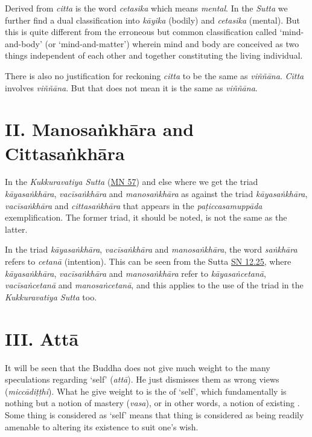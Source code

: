 Derived from \emph{citta} is the word \emph{cetasika} which means \emph{mental}. In the \emph{Sutta} we further find a dual classification into \emph{kāyika} (bodily) and \emph{cetasika} (mental). But this is quite different from the erroneous but common classification called `mind-and-body' (or `mind-and-matter') wherein mind and body are conceived as two things independent of each other and together constituting the living individual.

There is also no justification for reckoning \emph{citta} to be the same as \emph{viññāna}. \emph{Citta} involves \emph{viññāna}. But that does not mean it is the same as \emph{viññāna}.

\hypertarget{_ii_manosaux1e45khux101ra_and_cittasaux1e45khux101ra}{%
\section{II. Manosaṅkhāra and Cittasaṅkhāra}\label{_ii_manosaux1e45khux101ra_and_cittasaux1e45khux101ra}}

In the \emph{Kukkuravatiya Sutta} (\href{https://suttacentral.net/mn57/en/bodhi}{MN 57}) and else where we get the triad \emph{kāyasaṅkhāra}, \emph{vacīsaṅkhāra} and \emph{manosaṅkhāra} as against the triad \emph{kāyasaṅkhāra}, \emph{vacīsaṅkhāra} and \emph{cittasaṅkhāra} that appears in the \emph{paṭiccasamuppāda} exemplification. The former triad, it should be noted, is not the same as the latter.

In the triad \emph{kāyasaṅkhāra}, \emph{vacīsaṅkhāra} and \emph{manosaṅkhāra}, the word \emph{saṅkhāra} refers to \emph{cetanā} (intention). This can be seen from the Sutta \href{https://suttacentral.net/sn12.25/en/bodhi}{SN 12.25}, where \emph{kāyasaṅkhāra}, \emph{vacīsaṅkhāra} and \emph{manosaṅkhāra} refer to \emph{kāyasaṅcetanā}, \emph{vacīsaṅcetanā} and \emph{manosaṅcetanā}, and this applies to the use of the triad in the \emph{Kukkuravatiya Sutta} too.

\hypertarget{_iii_attux101}{%
\section{III. Attā}\label{_iii_attux101}}

It will be seen that the Buddha does not give much weight to the many speculations regarding `self' (\emph{attā}). He just dismisses them as wrong views (\emph{miccādiṭṭhi}). What he  give weight to is the  of `self', which fundamentally is nothing but a notion of mastery (\emph{vasa}), or in other words, a notion of existing . Some thing is considered as `self' means that thing is considered as being readily amenable to altering its existence to suit one's wish.

